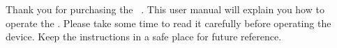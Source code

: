 \documentclass[a4paper, final, 12pt, oneside]{refart}
\numberwithin{equation}{section}
\numberwithin{table}{section}
\numberwithin{figure}{section}
\begin{document}





\tableofcontents
\newpage

\listoffigures
\listoftables
\newpage



Thank you for purchasing the \productNumber ~\productName. This user
manual will explain you how to operate the \productName. Please take
some time to read it carefully before operating the device. Keep the
instructions in a safe place for future reference.
\newpage











\newpage
\printindex
\end{document}
